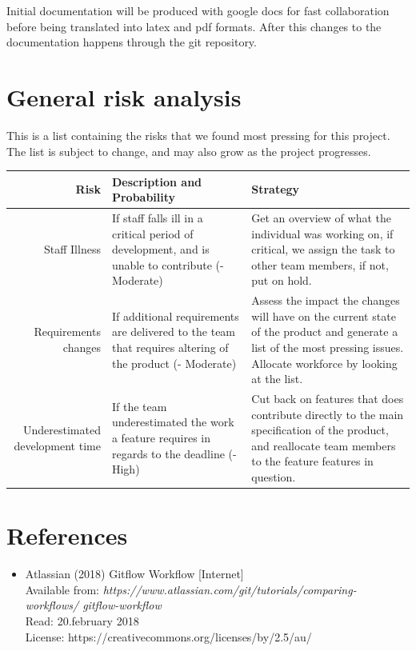 \documentclass[12pt]{article}%
\begin{document}
\vspace{5mm} %
Initial documentation will be produced with google docs for fast collaboration before being translated into latex and pdf formats. After this changes to the documentation happens through the git repository.



\section{General risk analysis}
This is a list containing the risks that we found most pressing for this project. The list is subject to change, and may also grow as the project progresses.


\begin{tabularx}{\linewidth}{ r X X }
\hline
Risk & Description and Probability & Strategy \\ \hline

Staff Illness
& If staff falls ill in a critical period of development, and is unable to contribute (- Moderate)
& Get an overview of what the individual was working on, if critical, we assign the task to other team members, if not, put on hold.\\

Requirements changes
&If additional requirements are delivered to the team that requires altering of the product (- Moderate)
& Assess the impact the changes will have on the current state of the product and generate a list of the most pressing issues. Allocate workforce by looking at the list.\\ \hline
Underestimated development time
&If the team underestimated the work a feature requires in regards to the deadline (- High)
& Cut back on features that does contribute directly to the main specification of the product, and reallocate team members to the feature features in question.                 \\ \hline
\end{tabularx}

\vspace{30mm}
\section{References}
\begin{itemize}
\item Atlassian (2018) Gitflow Workflow [Internet] \\
	  Available from: \textit{https://www.atlassian.com/git/tutorials/comparing-workflows/
	  gitflow-workflow} \\
	  Read: 20.february 2018\\
	  License: https://creativecommons.org/licenses/by/2.5/au/
\end{itemize}
\end{document}
